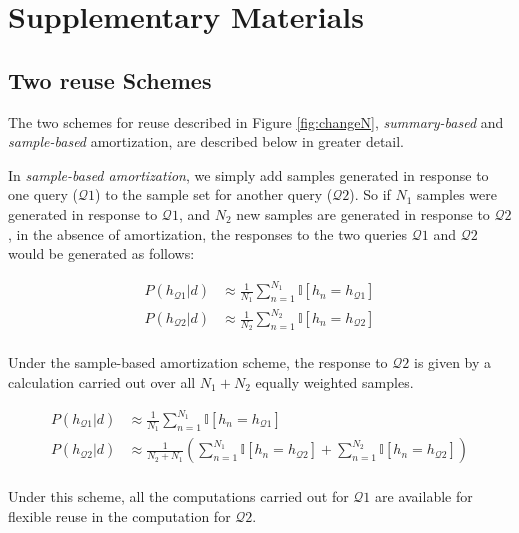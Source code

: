 \chapter{Supplementary Materials}
\label{app}

\section{Two reuse Schemes}
\label{app:2schemes}

The two schemes for reuse described in Figure \ref{fig:changeN}, \emph{summary-based} and \emph{sample-based} amortization, are described below in greater detail. 


In \emph{sample-based amortization}, we simply add samples generated in response to one query ($\mathcal{Q}1$) to the sample set for another query ($\mathcal{Q}2$). So if $N_1$ samples were generated in response to $\mathcal{Q}1$, and $N_2$ new samples are generated in response to $\mathcal{Q}2$, in the absence of amortization, the responses to the two queries $\mathcal{Q}1$ and $\mathcal{Q}2$ would be generated as follows:

\begin{align*}
\textstyle
P(h_{\mathcal{Q}1}|d) & \approx \frac{1}{N_1}\sum_{n=1}^{N_1} \mathbb{I}[h_n=h_{\mathcal{Q}1}]\\
P(h_{\mathcal{Q}2}|d) & \approx \frac{1}{N_2}\sum_{n=1}^{N_2} \mathbb{I}[h_n=h_{\mathcal{Q}2}]\\
\end{align*}

Under the sample-based amortization scheme, the response to $\mathcal{Q}2$ is given by a calculation carried out over all $N_1 + N_2$ equally weighted samples.

\begin{align*}
\textstyle
P(h_{\mathcal{Q}1}|d) & \approx \frac{1}{N_1}\sum_{n=1}^{N_1} \mathbb{I}[h_n=h_{\mathcal{Q}1}]\\
P(h_{\mathcal{Q}2}|d) & \approx \frac{1}{N_2 + N_1}  \left( \sum_{n=1}^{N_1} \mathbb{I}[h_n=h_{\mathcal{Q}2}] + \sum_{n=1}^{N_2} \mathbb{I}[h_n=h_{\mathcal{Q}2}] \right)\\
\end{align*}

Under this scheme, all the computations carried out for $\mathcal{Q}1$ are available for flexible reuse in the computation for $\mathcal{Q}2$. 

